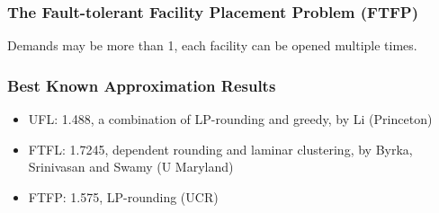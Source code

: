 \documentclass[hyperref, xcolor=dvipsnames]{beamer}
\begin{document}
\begin{frame}
  \frametitle{The Fault-tolerant Facility Placement Problem (FTFP)}
  Demands may be more than 1, each facility can be opened multiple times.


\end{frame}

\begin{frame}
  \frametitle{Best Known Approximation Results}
  \begin{itemize}
  \item UFL: 1.488, a combination of LP-rounding and greedy, by Li (Princeton)
  \item FTFL: 1.7245, dependent rounding and laminar clustering, by Byrka, Srinivasan and Swamy (U Maryland)
  \item FTFP: 1.575, LP-rounding (UCR)
  \end{itemize}
\end{frame}
\end{document}
